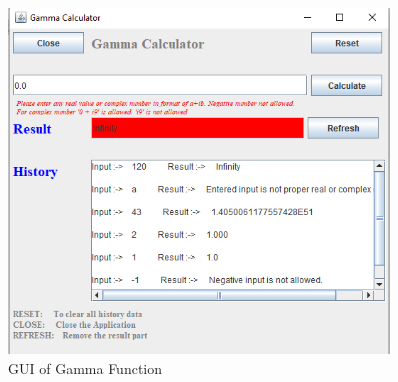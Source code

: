 \documentclass[final]{beamer}
\newlength{\sepwid}
\newlength{\onecolwid}
\newlength{\twocolwid}
\begin{document}
\begin{frame}
\begin{columns}[t]
\begin{column}{\onecolwid}
\begin{figure}
\includegraphics[width=0.8\linewidth]{img/d4_1.png}
\caption{GUI of Gamma Function}
\label{fig:GUI of Gamma Function}
\end{figure}


\end{column} %

\begin{column}{\sepwid}\end{column} %

\begin{column}{\twocolwid} %

\begin{columns}[t,totalwidth=\twocolwid] %

\begin{column}{\onecolwid}\vspace{-.74in} %



\end{column}
\end{columns}
\end{column}
\end{columns}
\end{frame}
\end{document}
